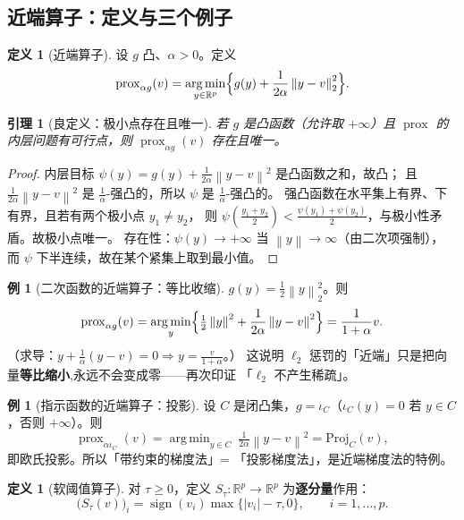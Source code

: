 \documentclass[11pt,a4paper,UTF8]{ctexart}
\theoremstyle{plain}
\newtheorem{lemma}[theorem]{引理}
\theoremstyle{definition}
\newtheorem{definition}[theorem]{定义}
\newtheorem{example}[theorem]{例}
\theoremstyle{remark}
\newcommand{\R}{\mathbb{R}}
\newcommand{\norm}[1]{\left\lVert #1 \right\rVert}
\newcommand{\abs}[1]{\left\lvert #1 \right\rvert}
\newcommand{\prox}{\operatorname{prox}}
\DeclareMathOperator*{\argmin}{arg\,min}
\DeclareMathOperator{\sign}{sign}
\begin{document}
\subsection{近端算子：定义与三个例子}

\begin{definition}[近端算子]\label{def:prox}
设 $g$ 凸、$\alpha>0$。定义
\[
\prox_{\alpha g}(v)=\argmin_{y\in\R^p}\Bigl\{g(y)+\frac{1}{2\alpha}\norm{y-v}_2^2\Bigr\}.
\]
\end{definition}

\begin{lemma}[良定义：极小点存在且唯一]\label{lem:proxwell}
若 $g$ 是凸函数（允许取 $+\infty$）且 $\prox$ 的内层问题有可行点，则 $\prox_{\alpha g}(v)$ 存在且唯一。
\end{lemma}

\begin{proof}
内层目标 $\psi(y)=g(y)+\frac{1}{2\alpha}\norm{y-v}^2$ 是凸函数之和，故凸；
且 $\frac{1}{2\alpha}\norm{y-v}^2$ 是 $\frac1\alpha$-强凸的，所以 $\psi$ 是 $\frac1\alpha$-强凸的。
强凸函数在水平集上有界、下有界，且若有两个极小点 $y_1\neq y_2$，
则 $\psi(\frac{y_1+y_2}{2})<\frac{\psi(y_1)+\psi(y_2)}{2}$，与极小性矛盾。故极小点唯一。
存在性：$\psi(y)\to+\infty$ 当 $\norm y\to\infty$（由二次项强制），
而 $\psi$ 下半连续，故在某个紧集上取到最小值。
\end{proof}

\begin{example}[二次函数的近端算子：等比收缩]
$g(y)=\tfrac12\norm y_2^2$。则
\[
\prox_{\alpha g}(v)=\argmin_y\Bigl\{\tfrac12\norm y^2+\frac{1}{2\alpha}\norm{y-v}^2\Bigr\}
=\frac{1}{1+\alpha}v .
\]
（求导：$y+\frac{1}{\alpha}(y-v)=0\Rightarrow y=\frac{v}{1+\alpha}$。）
这说明 $\ell_2$ 惩罚的「近端」只是把向量\textbf{等比缩小},永远不会变成零——再次印证
「$\ell_2$ 不产生稀疏」。
\end{example}

\begin{example}[指示函数的近端算子：投影]
设 $C$ 是闭凸集，$g=\iota_C$（$\iota_C(y)=0$ 若 $y\in C$，否则 $+\infty$）。则
\[
\prox_{\alpha\iota_C}(v)=\argmin_{y\in C}\ \tfrac{1}{2\alpha}\norm{y-v}^2=\mathrm{Proj}_C(v),
\]
即欧氏投影。所以「带约束的梯度法」= 「投影梯度法」，是近端梯度法的特例。
\end{example}

\begin{definition}[软阈值算子]\label{def:soft}
对 $\tau\ge0$，定义 $S_\tau:\R^p\to\R^p$ 为\textbf{逐分量}作用：
\[
\bigl(S_\tau(v)\bigr)_i=\sign(v_i)\max\{\abs{v_i}-\tau,0\},\qquad i=1,\dots,p .
\]
\end{definition}
\end{document}
